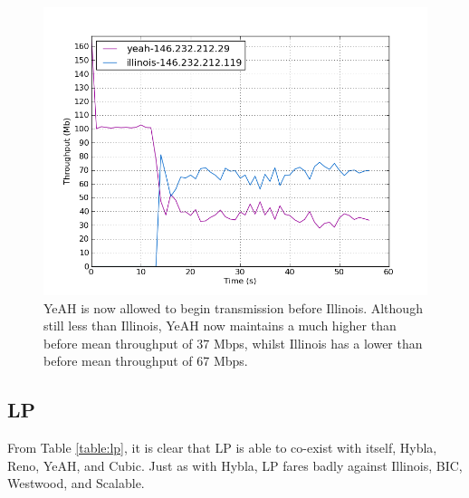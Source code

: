 \documentclass[11pt,a4paper,twocolumn]{article}
\begin{document}
\begin{figure}[p]
	\includegraphics[width=\linewidth]{exp29b.png}
	\caption{YeAH is now allowed to begin transmission before Illinois. Although still less than Illinois,
		YeAH now maintains a much higher than before mean throughput of 37 Mbps, whilst Illinois has
		a lower than before mean throughput of 67 Mbps.}
	\label{fig:yeah_illinois}
\end{figure}

\subsection{LP}
\label{subsec:lp}
From Table \ref{table:lp}, it is clear that LP is able to co-exist with itself, Hybla, Reno, YeAH, and Cubic.
Just as with Hybla, LP fares badly against Illinois, BIC, Westwood, and Scalable.
\end{document}
